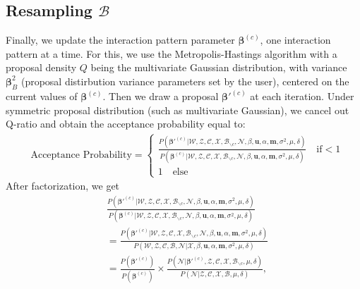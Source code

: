 \documentclass[a4paper]{article}
\begin{document}
 \subsection{Resampling $\mathcal{B}$}  \label{subsec: Resampling B}
 Finally, we update the interaction pattern parameter $\boldsymbol{\beta}^{(c)}$, one interaction pattern at a time. For this, we use the Metropolis-Hastings algorithm with a proposal density $Q$ being the multivariate Gaussian distribution, with variance $\boldsymbol{\beta}^2_B$ (proposal distirbution variance parameters set by the
 user), centered on the current values of $\boldsymbol{\beta}^{(c)}$. Then we draw a proposal $\boldsymbol{\beta}'^{(c)}$ at each iteration. Under symmetric proposal distribution (such as multivariate Gaussian), we cancel out Q-ratio and obtain the acceptance probability equal to:
 \begin{equation}
 \begin{split}
 & \mbox{Acceptance Probability}=
 \begin{cases}  \frac{P(\boldsymbol{\beta}'^{(c)}|\mathcal{W}, \mathcal{Z}, \mathcal{C}, \mathcal{X}, \mathcal{B}_{\backslash c}, \mathcal{N},\beta, \boldsymbol{u}, \alpha, \boldsymbol{m},  \sigma^2, \mu, \delta)}{P(\boldsymbol{\beta}^{(c)}|\mathcal{W}, \mathcal{Z}, \mathcal{C}, \mathcal{X}, \mathcal{B}_{\backslash c}, \mathcal{N},\beta, \boldsymbol{u}, \alpha, \boldsymbol{m},  \sigma^2, \mu, \delta)}\quad\text{if}  <1\\
 1 \quad \text{else}
 \end{cases}
 \end{split}
 \end{equation}
 After factorization, we get
 \begin{equation}
 \begin{aligned}
&\frac{P(\boldsymbol{\beta}'^{(c)}|\mathcal{W}, \mathcal{Z}, \mathcal{C}, \mathcal{X}, \mathcal{B}_{\backslash c},  \mathcal{N},\beta, \boldsymbol{u}, \alpha, \boldsymbol{m},  \sigma^2, \mu, \delta)}{P(\boldsymbol{\beta}^{(c)}|\mathcal{W}, \mathcal{Z}, \mathcal{C}, \mathcal{X},  \mathcal{B}_{\backslash c}, \mathcal{N},\beta, \boldsymbol{u}, \alpha, \boldsymbol{m},  \sigma^2, \mu, \delta)} \\&=\frac{P(\boldsymbol{\beta}'^{(c)}|\mathcal{W}, \mathcal{Z}, \mathcal{C}, \mathcal{X}, \mathcal{B}_{\backslash c},  \mathcal{N},\beta, \boldsymbol{u}, \alpha, \boldsymbol{m},  \sigma^2, \mu, \delta)}{P(\mathcal{W}, \mathcal{Z}, \mathcal{C}, \mathcal{B}, \mathcal{N} |\mathcal{X},  \beta, \boldsymbol{u}, \alpha, \boldsymbol{m},  \sigma^2, \mu, \delta)}\\&=\frac{P(\boldsymbol{\beta}'^{(c)})}{P(\boldsymbol{\beta}^{(c)})}\times\frac{P(\mathcal{N}|\boldsymbol{\beta}'^{(c)}, \mathcal{Z}, \mathcal{C}, \mathcal{X}, \mathcal{B}_{\backslash c}, \mu, \delta)}{P(\mathcal{N}|\mathcal{Z}, \mathcal{C}, \mathcal{X}, \mathcal{B}, \mu, \delta)},
 \end{aligned}
 \end{equation}
\end{document}
